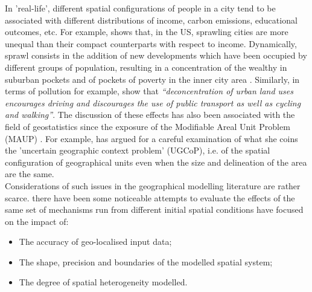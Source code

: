 \documentclass[3p,times,procedia]{elsarticle}
\begin{document}
In 'real-life', different spatial configurations of people in a city tend to be associated with different distributions of income, carbon emissions, educational outcomes, etc. For example, \citet{wheeler2006urban} shows that, in the US, sprawling cities are more unequal than their compact counterparts with respect to income. Dynamically, sprawl consists in the addition of new developments which have been occupied by different groups of population, resulting in a concentration of the wealthy in suburban pockets and of pockets of poverty in the inner city area \citep{jargowsky2002sprawl}. Similarly, in terms of pollution for example, \citet[p.173]{schwanen2001travel} show that \textit{``deconcentration of urban land uses encourages driving and discourages the use of public transport as well as cycling and walking''}. The discussion of these effects has also been associated with the field of geostatistics since the exposure of the Modifiable Areal Unit Problem (MAUP) \citep{Openshaw1984, FotheringhamWong1991}. For example, \citet{Kwan2012} has argued for a careful examination of what she coins the 'uncertain geographic context problem' (UGCoP), i.e. of the spatial configuration of geographical units even when the size and delineation of the area are the same.\\

Considerations of such issues in the geographical modelling literature are rather scarce. there have been some noticeable attempts to evaluate the effects of the same set of mechanisms run from different initial spatial conditions have focused on the impact of:
\begin{itemize}
\item The accuracy of geo-localised input data;
\item The shape, precision and boundaries of the modelled spatial system;
\item The degree of spatial heterogeneity modelled.
\end{itemize}

\end{document}
